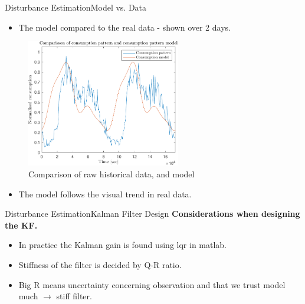 \begin{frame}{Disturbance Estimation}{Model vs. Data}
	\begin{itemize}
			\item The model compared to the real data - shown over 2 days. 
	\end{itemize}
		\begin{figure}[h!]
			\centering
			\includegraphics[width=0.6\textwidth]{Topics/KalmanEstimator/Graphics/Comparisson.pdf}
			\caption{Comparison of raw historical data, and model}
			\label{fig:Comparison}
		\end{figure}
	\begin{itemize}
		\item The model follows the visual trend in real data.
	\end{itemize}	
\end{frame}


\begin{frame}{Disturbance Estimation}{Kalman Filter Design}
	\textbf{Considerations when designing the KF.}
	\begin{itemize}
		\item In practice the Kalman gain is found using lqr in matlab.
		\item Stiffness of the filter is decided by Q-R ratio.
		\item Big R means uncertainty concerning observation and that we trust model much $\rightarrow$ stiff filter.
	\end{itemize}
\end{frame}